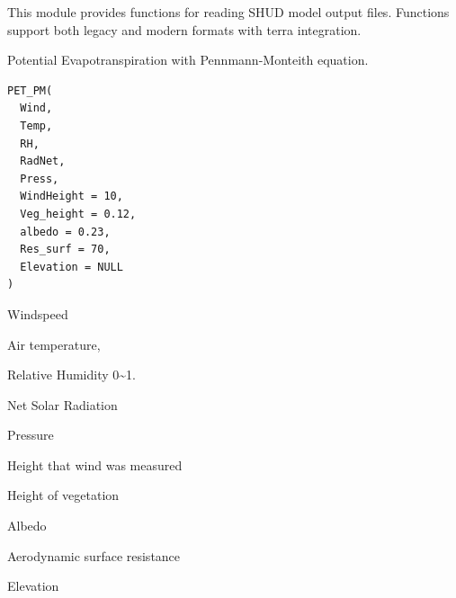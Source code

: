 \documentclass[a4paper]{book}
\begin{document}
%
\begin{Description}\relax
This module provides functions for reading SHUD model output files.
Functions support both legacy and modern formats with terra integration.
\end{Description}
%
\begin{Description}\relax
Potential Evapotranspiration with Pennmann-Monteith equation.
\end{Description}
%
\begin{Usage}
\begin{verbatim}
PET_PM(
  Wind,
  Temp,
  RH,
  RadNet,
  Press,
  WindHeight = 10,
  Veg_height = 0.12,
  albedo = 0.23,
  Res_surf = 70,
  Elevation = NULL
)
\end{verbatim}
\end{Usage}
%
\begin{Arguments}
\begin{ldescription}
\item[\code{Wind}] Windspeed 

\item[\code{Temp}] Air temperature, 

\item[\code{RH}] Relative Humidity  0\textasciitilde{}1.

\item[\code{RadNet}] Net Solar Radiation 

\item[\code{Press}] Pressure 

\item[\code{WindHeight}] Height that wind was measured 

\item[\code{Veg\_height}] Height of vegetation 

\item[\code{albedo}] Albedo 

\item[\code{Res\_surf}] Aerodynamic surface resistance 

\item[\code{Elevation}] Elevation 
\end{ldescription}
\end{Arguments}
\end{document}
